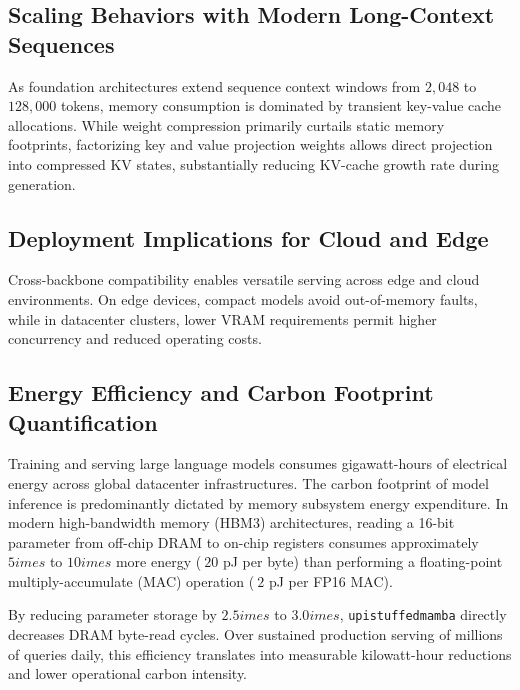 \subsection{Scaling Behaviors with Modern Long-Context Sequences}
As foundation architectures extend sequence context windows from $2{,}048$ to $128{,}000$ tokens, memory consumption is dominated by transient key-value cache allocations. While weight compression primarily curtails static memory footprints, factorizing key and value projection weights allows direct projection into compressed KV states, substantially reducing KV-cache growth rate during generation.

\subsection{Deployment Implications for Cloud and Edge}
Cross-backbone compatibility enables versatile serving across edge and cloud environments. On edge devices, compact models avoid out-of-memory faults, while in datacenter clusters, lower VRAM requirements permit higher concurrency and reduced operating costs.

\subsection{Energy Efficiency and Carbon Footprint Quantification}
Training and serving large language models consumes gigawatt-hours of electrical energy across global datacenter infrastructures. The carbon footprint of model inference is predominantly dictated by memory subsystem energy expenditure. In modern high-bandwidth memory (HBM3) architectures, reading a 16-bit parameter from off-chip DRAM to on-chip registers consumes approximately $5	imes$ to $10	imes$ more energy ($~20$ pJ per byte) than performing a floating-point multiply-accumulate (MAC) operation ($~2$ pJ per FP16 MAC).

By reducing parameter storage by $2.5	imes$ to $3.0	imes$, \texttt{upistuffedmamba} directly decreases DRAM byte-read cycles. Over sustained production serving of millions of queries daily, this efficiency translates into measurable kilowatt-hour reductions and lower operational carbon intensity.

